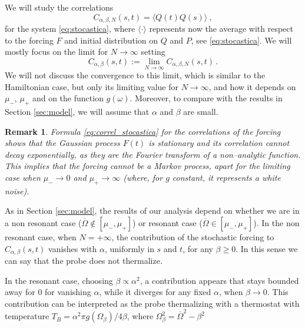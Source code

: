 \documentclass[11pt]{article}
\numberwithin{equation}{section}
\def\red{\textcolor{red}}
\def\red{}
\newtheorem{rmk}[theorem]{Remark}
\numberwithin{theorem}{section}
\newcommand{\dam}{\beta}
\begin{document}
We will study the correlations 
\begin{equation}\label{eq:Cs}
C_{\alpha,\dam,N}(s,t)=\langle Q(t)Q(s)\rangle\ ,
\end{equation}
for the system \eqref{eq:stocastica}, where $\langle\cdot\rangle$ represents now the average with respect to the 
forcing $F$ and initial
distribution on $Q$ and $P$, see \eqref{eq:stocastica}. We will mostly focus on 
the limit for $N\to \infty$ setting
\begin{equation}\label{eq:Csinf}
C_{\alpha,\dam}(s,t):=\lim_{N\to\infty}C_{\alpha,\dam,N}(s,t)\, .
\end{equation}
We will not discuss the convergence to this limit, which is similar to the
Hamiltonian case, but only its limiting value \red{for $N\to \infty$, and how it depends on $\mu_-$, $\mu_+$ and on the function $g(\omega)$}. Moreover,
to compare with the results in Section \ref{sec:model}, we will assume that $\alpha$ and $\beta$ are small.

\begin{rmk}\label{rmk:Markov}
\emph{Formula \eqref{eq:correl_stocastica} for the correlations of the forcing shows that the Gaussian process $F(t)$ is
stationary and its correlation cannot decay exponentially, as they are the Fourier transform of a non--analytic
function. This implies that the forcing cannot be a Markov process, apart for the limiting case when $\mu_-\to 0$ and
$\mu_+\to \infty$ (where, for $g$ constant, it represents a white noise).}
\end{rmk}

As in Section \ref{sec:model}, the results of our analysis depend on whether we are in a non resonant case
($\overline\Omega\not\in[\mu_-,\mu_+]$) or resonant case ($\overline\Omega\in[\mu_-,\mu_+]$). In the non resonant case, when $N=+\infty$,
the contribution of the stochastic forcing to $C_{\alpha,\dam}(s,t)$ vanishes with $\alpha$, uniformly in $s$ and $t$,
for any $\dam\ge 0$. In this sense we can say that the probe does not thermalize.

In the resonant case, choosing $\dam\propto\alpha^2$, a contribution appears that stays bounded away for 0 for vanishing
$\alpha$, while it diverges for any fixed $\alpha$, when $\dam\to 0$. This contribution can be interpreted as the 
probe thermalizing with a thermostat with temperature $T_B=\alpha^2\pi g(\Omega_\dam)/4\dam$, where $\Omega_\dam^2=\overline\Omega^2-\dam^2$
\end{document}
